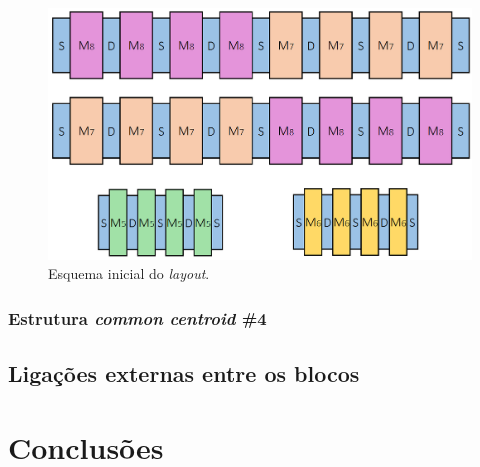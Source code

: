 \documentclass[11pt]{article}
\numberwithin{equation}{section}
\begin{document}
\begin{figure}[H]
	\centering
	\includegraphics[keepaspectratio=true, scale=0.30]{teoricas/layout/cc3_1}
	\vspace{-0.5em}
	\caption{Esquema inicial do \textit{layout}.}
	\vspace{-0.8em} 
\end{figure}

\subsubsection{Estrutura \textit{common centroid} \#4}

\subsection{Ligações externas entre os blocos}

\pagebreak

\section{Conclusões}
\end{document}
